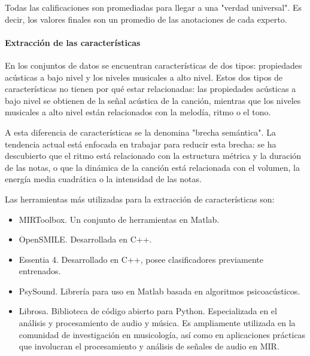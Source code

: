 \documentclass[12pt,a4paper,Spanish]{article}
\begin{document}
Todas las calificaciones son promediadas para llegar a una "verdad universal". Es decir, los valores finales son un promedio de las anotaciones de cada experto.

\paragraph{Extracción de las características}
En los conjuntos de datos se encuentran características de dos tipos: propiedades acústicas a bajo nivel y los niveles musicales a alto nivel. Estos dos tipos de características no tienen por qué estar relacionadas: las propiedades acústicas a bajo nivel se obtienen de la señal acústica de la canción, mientras que los niveles musicales a alto nivel están relacionados con la melodía, ritmo o el tono.
\newline

A esta diferencia de características se la denomina "brecha semántica". La tendencia actual está enfocada en trabajar para reducir esta brecha: se ha descubierto que el ritmo está relacionado con la estructura métrica y la duración de las notas, o que la dinámica de la canción está relacionada con el volumen, la energía media cuadrática o la intensidad de las notas.
\newline

Las herramientas más utilizadas para la extracción de características son:
\begin{itemize}
	\item MIRToolbox. Un conjunto de herramientas en Matlab.
	\item OpenSMILE. Desarrollada en C++.
	\item Essentia 4. Desarrollado en C++, posee clasificadores previamente entrenados.
	\item PsySound. Librería para uso en Matlab basada en algoritmos psicoacústicos.
	\item Librosa. Biblioteca de código abierto para Python. Especializada en el análisis y procesamiento de audio y música. Es ampliamente utilizada en la comunidad de investigación en musicología, así como en aplicaciones prácticas que involucran el procesamiento y análisis de señales de audio en MIR.
\end{itemize}
\end{document}
